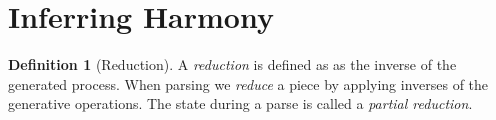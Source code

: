\documentclass[12pt,a4paper,twoside,openright]{report}
\theoremstyle{definition}
\newtheorem{definition}{Definition}[section]
\begin{document}
%
\FloatBarrier
\section{Inferring Harmony}
\begin{definition}[Reduction]
  A \textit{reduction} is defined as as the inverse of the generated process. When parsing we \textit{reduce} a piece by applying inverses of the generative operations. The state during a parse is called a \textit{partial reduction}.
\end{definition}
\end{document}
